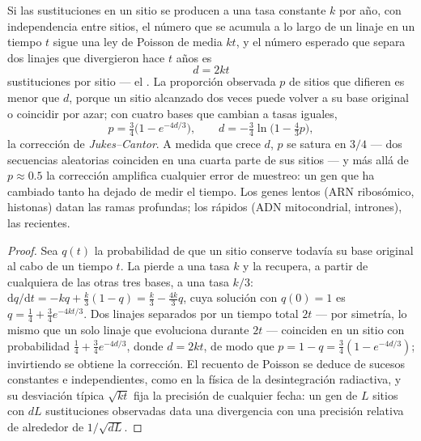 \begin{theorem}\label{thm:b2:phylogenetic-trees:clock}
Si las sustituciones en un sitio se producen a una tasa constante $k$ por
año, con independencia entre sitios, el número que se acumula a lo largo
de un linaje en un tiempo $t$ sigue una ley de Poisson de media $kt$, y el
número esperado que separa dos linajes que divergieron hace $t$ años es
\[
d = 2kt
\]
sustituciones por sitio --- el \emph{}. La proporción
observada $p$ de sitios que difieren es menor que $d$, porque un sitio
alcanzado dos veces puede volver a su base original o coincidir por azar;
con cuatro bases que cambian a tasas iguales,
\[
p = \tfrac{3}{4}\bigl(1 - e^{-4d/3}\bigr), \qquad
d = -\tfrac{3}{4}\ln\bigl(1 - \tfrac{4}{3}p\bigr),
\]
la corrección de \emph{Jukes--Cantor}. A medida que crece $d$, $p$ se
satura en
$3/4$ --- dos secuencias aleatorias coinciden en una cuarta parte de sus
sitios --- y más allá de $p \approx 0.5$ la corrección amplifica cualquier
error de muestreo: un gen que ha cambiado tanto ha dejado de medir el
tiempo. Los genes lentos (ARN ribosómico, histonas) datan las ramas
profundas; los rápidos (ADN mitocondrial, intrones), las recientes.
\end{theorem}
\begin{proof}
Sea $q(t)$ la probabilidad de que un sitio conserve todavía su base
original al cabo de un tiempo $t$. La pierde a una tasa $k$ y la recupera,
a partir de cualquiera de las otras tres bases, a una tasa $k/3$:
$\mathrm{d}q/\mathrm{d}t = -kq + \tfrac{k}{3}(1 - q) = \tfrac{k}{3} -
\tfrac{4k}{3}q$, cuya solución con $q(0) = 1$ es $q = \tfrac14 +
\tfrac34 e^{-4kt/3}$. Dos linajes separados por un tiempo total $2t$ ---
por simetría, lo mismo que un solo linaje que evoluciona durante $2t$ ---
coinciden en un sitio con probabilidad $\tfrac14 + \tfrac34 e^{-4d/3}$, donde $d =
2kt$, de modo que $p = 1 - q = \tfrac34(1 - e^{-4d/3})$; invirtiendo se
obtiene la corrección. El recuento de Poisson se deduce de sucesos
constantes e independientes, como en la física de la desintegración
radiactiva, y su desviación típica $\sqrt{kt}$ fija la precisión de
cualquier fecha: un gen de $L$
sitios con $dL$ sustituciones observadas data una divergencia con una
precisión relativa de alrededor de $1/\sqrt{dL}$.
\end{proof}

